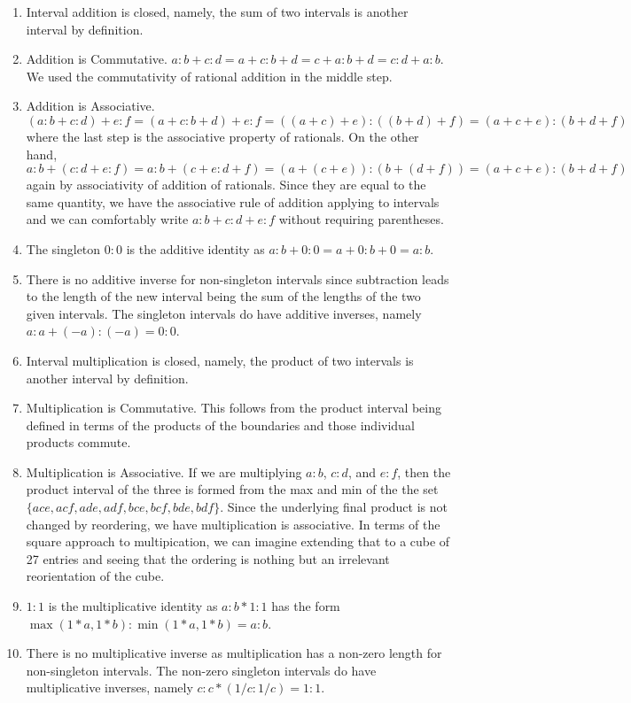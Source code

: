 \documentclass[12pt]{article}
\theoremstyle{remark}
\begin{document}
\begin{enumerate}
    \item Interval addition is closed, namely, the sum of two intervals is another interval by definition. 
    \item Addition is Commutative. $a:b + c:d= a+c : b+d = c+a:b+d = c:d + a:b$. We used the commutativity of rational addition in the middle step. 
    \item Addition is Associative. $(a:b + c:d) + e:f = (a+c:b+d)+e:f = ((a+c)+e):((b+d)+f) = (a+c+e):(b+d+f)$ where the last step is the associative property of rationals.  On the other hand, $a:b + (c:d+e:f) = a:b + (c+e:d+f) = (a+(c+e)):(b+(d+f)) = (a+c+e):(b+d+f)$ again by associativity of addition of rationals. Since they are equal to the same quantity, we have the associative rule of addition applying to intervals and we can comfortably write $a:b + c:d + e:f$ without requiring parentheses. 
    \item The singleton $0:0$ is the additive identity as $a:b+0:0 = a+0:b+0 = a:b$. 
    \item There is no additive inverse for non-singleton intervals since subtraction leads to the length of the new interval being the sum of the lengths of the two given intervals. The singleton intervals do have additive inverses, namely $a:a + (-a):(-a) = 0:0$. 
    \item Interval multiplication is closed, namely, the product of two intervals is another interval by definition. 
    \item Multiplication is Commutative. This follows from the product interval being defined in terms of the products of the boundaries and those individual products commute. 
    \item Multiplication is Associative. If we are multiplying $a:b$, $c:d$, and $e:f$, then the product interval of the three is formed from the max and min of the the set $\{ace, acf, ade, adf, bce, bcf, bde, bdf\}$. Since the underlying final product is not changed by reordering, we have multiplication is associative. In terms of the square approach to multipication, we can imagine extending that to a cube of 27 entries and seeing that the ordering is nothing but an irrelevant reorientation of the cube. 
    \item $1:1$ is the multiplicative identity as $a:b*1:1$ has the form $\max(1*a, 1*b):\min(1*a, 1*b) = a:b$. 
    \item There is no multiplicative inverse as multiplication has a non-zero length for non-singleton intervals. The non-zero singleton intervals do have multiplicative inverses, namely $c:c * (1/c : 1/c) = 1:1$.
\end{enumerate}
\end{document}
